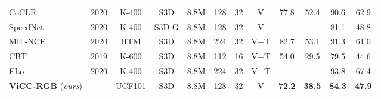 \documentclass[10pt,twocolumn,letterpaper]{article}
\newcommand\Tstrut{\rule{0pt}{2.2ex}}         \newcommand\Bstrut{\rule[-0.9ex]{0pt}{0pt}}   \usepackage{booktabs}
\begin{document}
\begin{table*}
\begin{center}
{\begin{tabular}{lccccccccccc}
{\color[HTML]{9B9B9B} CoCLR  \cite{han_self-supervised_2020}}      	& {\color[HTML]{9B9B9B} 2020} & {\color[HTML]{9B9B9B} K-400} & {\color[HTML]{9B9B9B} S3D}      & {\color[HTML]{9B9B9B} 8.8M}  & {\color[HTML]{9B9B9B} 128} & {\color[HTML]{9B9B9B} 32} & {\color[HTML]{9B9B9B} V}   & {\color[HTML]{9B9B9B} 77.8} & {\color[HTML]{9B9B9B} 52.4} & {\color[HTML]{9B9B9B} 90.6} & {\color[HTML]{9B9B9B} 62.9} \\
{\color[HTML]{9B9B9B} SpeedNet \cite{benaim_speednet_2020}}      	& {\color[HTML]{9B9B9B} 2020} & {\color[HTML]{9B9B9B} K-400} & {\color[HTML]{9B9B9B} S3D-G}      & {\color[HTML]{9B9B9B} 8.8M}  & {\color[HTML]{9B9B9B} 128} & {\color[HTML]{9B9B9B} 32} & {\color[HTML]{9B9B9B} V}   & {\color[HTML]{9B9B9B} -} & {\color[HTML]{9B9B9B} -} & {\color[HTML]{9B9B9B} 81.1} & {\color[HTML]{9B9B9B} 48.8} \\ 
{\color[HTML]{9B9B9B} MIL-NCE \cite{miech_end--end_2020}}     		& {\color[HTML]{9B9B9B} 2020} & {\color[HTML]{9B9B9B} HTM \cite{miech_howto100m_2019}}   & {\color[HTML]{9B9B9B} S3D}      & {\color[HTML]{9B9B9B} 8.8M}  & {\color[HTML]{9B9B9B} 224} & {\color[HTML]{9B9B9B} 32} & {\color[HTML]{9B9B9B} V+T} & {\color[HTML]{9B9B9B} 82.7} & {\color[HTML]{9B9B9B} 53.1}& {\color[HTML]{9B9B9B} 91.3} & {\color[HTML]{9B9B9B} 61.0} \\
{\color[HTML]{9B9B9B} CBT \cite{sun_learning_2019}}         		& {\color[HTML]{9B9B9B} 2019} & {\color[HTML]{9B9B9B} K-600 \cite{carreira_short_2018}} & {\color[HTML]{9B9B9B} S3D}      & {\color[HTML]{9B9B9B} 8.8M}  & {\color[HTML]{9B9B9B} 112} & {\color[HTML]{9B9B9B} 16} & {\color[HTML]{9B9B9B} V+T} & {\color[HTML]{9B9B9B} 54.0} & {\color[HTML]{9B9B9B} 29.5}& {\color[HTML]{9B9B9B} 79.5} & {\color[HTML]{9B9B9B} 44.6} \\
{\color[HTML]{9B9B9B} ELo 
\cite{piergiovanni_evolving_2020}}   & {\color[HTML]{9B9B9B} 2020}         & {\color[HTML]{9B9B9B} K-400} & {\color[HTML]{9B9B9B} S3D}      & {\color[HTML]{9B9B9B} 8.8M}  & {\color[HTML]{9B9B9B} 224} & {\color[HTML]{9B9B9B} 32} & {\color[HTML]{9B9B9B} V+T} & {\color[HTML]{9B9B9B} -} & {\color[HTML]{9B9B9B} -} & {\color[HTML]{9B9B9B} 93.8} & {\color[HTML]{9B9B9B} 67.4} \\
\hline \Tstrut
\textbf{ViCC-RGB} (\textit{ours})                									&                             & UCF101                         & S3D                             & 8.8M                         & 128                        & 32                        & V            &	\textbf{72.2}	 &  \textbf{38.5}               & \textbf{84.3}               & \textbf{47.9}               \\

\end{tabular}}
\end{center}
\end{table*}
\end{document}

